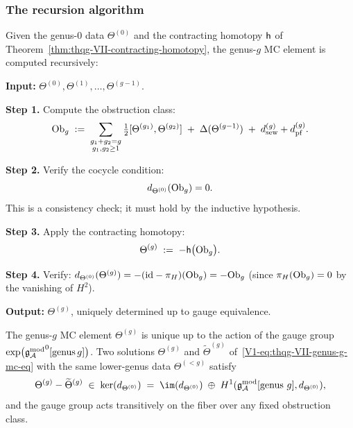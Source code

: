 \subsubsection{The recursion algorithm}

\begin{construction}
\label{constr:thqg-VII-mc-recursion}
Given the genus-$0$ data $\Theta^{(0)}$ and the contracting
homotopy $\mathsf{h}$ of
Theorem~\textup{\ref{thm:thqg-VII-contracting-homotopy}},
the genus-$g$ MC element is computed recursively:

\medskip
\noindent
\textbf{Input:} $\Theta^{(0)}, \Theta^{(1)}, \ldots,
\Theta^{(g-1)}$.

\medskip
\noindent
\textbf{Step 1.} Compute the obstruction class:
\begin{equation}%
\Ob_g
\;:=\;
\sum_{\substack{g_1+g_2=g \\ g_1,g_2 \geq 1}}
\tfrac{1}{2}[\Theta^{(g_1)},\Theta^{(g_2)}]
\;+\;
\Delta(\Theta^{(g-1)})
\;+\;
\dsew^{(g)} + \dpf^{(g)}.
\end{equation}

\textbf{Step 2.} Verify the cocycle condition:
\begin{equation}%
d_{\Theta^{(0)}}(\Ob_g) = 0.
\end{equation}
This is a consistency check; it must hold by the inductive
hypothesis.

\textbf{Step 3.} Apply the contracting homotopy:
\begin{equation}%
\Theta^{(g)}
\;:=\;
-\hCont\bigl(\Ob_g\bigr).
\end{equation}

\textbf{Step 4.} Verify:
$d_{\Theta^{(0)}}(\Theta^{(g)})
= -(\mathrm{id} - \pi_H)(\mathrm{Ob}_g)
= -\mathrm{Ob}_g$
(since $\pi_H(\mathrm{Ob}_g) = 0$ by the vanishing of $H^2$).

\medskip
\noindent
\textbf{Output:} $\Theta^{(g)}$, uniquely determined up to
gauge equivalence.
\end{construction}

\begin{theorem}
The genus-$g$ MC element $\Theta^{(g)}$ is unique up to the
action of the gauge group
$\exp\bigl({\mathfrak{g}_{\mathcal{A}}^{\mathrm{mod}}}^0[\mathrm{genus\,}g]\bigr)$.
Two solutions $\Theta^{(g)}$ and $\widetilde{\Theta}^{(g)}$
of~\eqref{V1-eq:thqg-VII-genus-g-mc-eq} with the same
lower-genus data $\Theta^{(<g)}$ satisfy
\begin{equation}%
\Theta^{(g)} - \widetilde{\Theta}^{(g)}
\;\in\;
\ker(d_{\Theta^{(0)}})
\;=\;
\im(d_{\Theta^{(0)}})
\;\oplus\;
H^1(\gAmod[\text{genus }g], d_{\Theta^{(0)}}),
\end{equation}
and the gauge group acts transitively on the fiber over any
fixed obstruction class.
\end{theorem}

